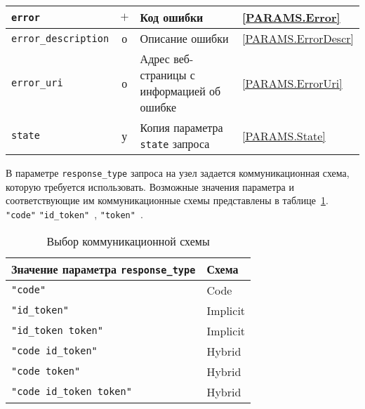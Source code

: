 \begin{table}[p]
\begin{tabular}{|l|c|p{9.0cm}|l|}
\hline
\hline
%
\lstinline!error! & $+$ & 
Код ошибки & 
\ref{PARAMS.Error}\\
\hline
%
\lstinline!error_description! & о & 
Описание ошибки &
\ref{PARAMS.ErrorDescr}\\
\hline
%
\lstinline!error_uri! & о & 
Адрес веб-страницы с информацией об ошибке &
\ref{PARAMS.ErrorUri}\\
\hline
%
\lstinline!state! & у & 
Копия параметра \lstinline!state! запроса &  
\ref{PARAMS.State}\\
\hline
\end{tabular}
\end{table}

В параметре \lstinline{response_type} запроса на узел
задается коммуникационная схема, которую требуется использовать.
%
Возможные значения параметра и соответствующие им коммуникационные схемы 
представлены в таблице~\ref{Table.OIDC.RespType}. 
%
 \lstinline{"code"}  \lstinline{"id_token"}~, 
\lstinline{"token"}~.

\begin{table}[hbt]
\caption{Выбор коммуникационной схемы}\label{Table.OIDC.RespType}
\begin{tabular}{|l|l|}
\hline
Значение параметра \lstinline!response_type! & Схема\\
\hline
\hline
\lstinline!"code"! & Code \\
\lstinline!"id_token"! & Implicit \\
\lstinline!"id_token token"! & Implicit \\
\lstinline!"code id_token"! & Hybrid \\
\lstinline!"code token"! & Hybrid \\
\lstinline!"code id_token token"! & Hybrid \\
\hline
\end{tabular}
\end{table}


